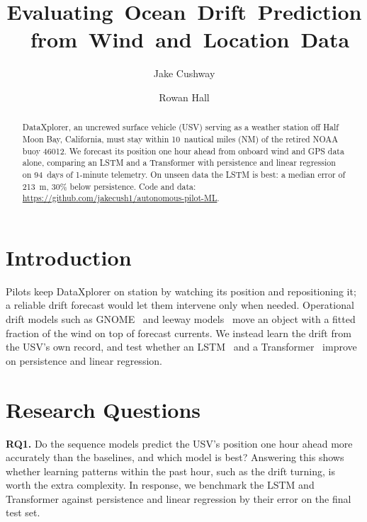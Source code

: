 \documentclass[sigconf]{acmart}
\begin{document}
\title{\mbox{Evaluating Ocean Drift Prediction from Wind and Location Data}}
\author{Jake Cushway}

\author{Rowan Hall}


\begin{abstract}
DataXplorer, an uncrewed surface vehicle (USV) serving as a weather station off Half Moon Bay, California, must stay within 10~nautical miles (NM) of the retired NOAA buoy 46012. We forecast its position one hour ahead from onboard wind and GPS data alone, comparing an LSTM and a Transformer with persistence and linear regression on 94~days of 1-minute telemetry. On unseen data the LSTM is best: a median error of 213~m, 30\% below persistence. Code and data: \url{https://github.com/jakecush1/autonomous-pilot-ML}.
\end{abstract}

\maketitle
\pagestyle{empty}

\section{Introduction}
Pilots keep DataXplorer on station by watching its position and repositioning it; a reliable drift forecast would let them intervene only when needed. Operational drift models such as GNOME~\cite{zelenke2012gnome} and leeway models~\cite{breivik2011leeway} move an object with a fitted fraction of the wind on top of forecast currents. We instead learn the drift from the USV's own record, and test whether an LSTM~\cite{hochreiter1997lstm} and a Transformer~\cite{vaswani2017attention} improve on persistence and linear regression.


\section{Research Questions}
\noindent\textbf{RQ1.} Do the sequence models predict the USV's position one hour ahead more accurately than the baselines, and which model is best? Answering this shows whether learning patterns within the past hour, such as the drift turning, is worth the extra complexity. In response, we benchmark the LSTM and Transformer against persistence and linear regression by their error on the final test set.
\end{document}
